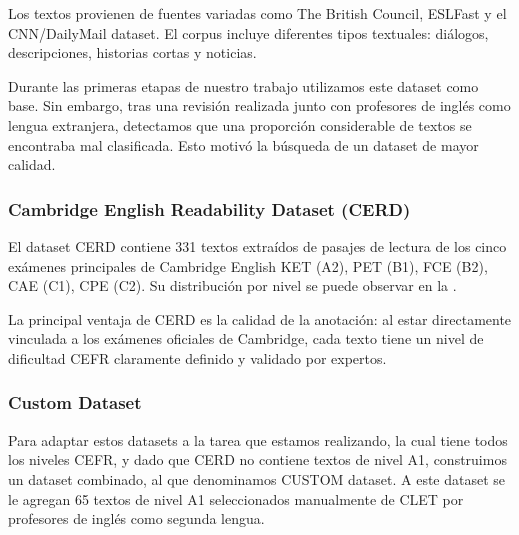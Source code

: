 Los textos provienen de fuentes variadas como The British Council, ESLFast y el CNN/DailyMail dataset. El corpus incluye diferentes tipos textuales: diálogos, descripciones, historias cortas y noticias.

Durante las primeras etapas de nuestro trabajo utilizamos este dataset como base. Sin embargo, tras una revisión realizada junto con profesores de inglés como lengua extranjera, detectamos que una proporción considerable de textos se encontraba mal clasificada. Esto motivó la búsqueda de un dataset de mayor calidad.

\subsubsection*{Cambridge English Readability Dataset (CERD)}
El dataset CERD contiene 331 textos extraídos de pasajes de lectura de los cinco exámenes principales de Cambridge English KET (A2), PET (B1), FCE (B2), CAE (C1), CPE (C2). Su distribución por nivel se puede observar en la .

\begin{table}[H]
\centering
{}
\caption{Distribución de la clasificación de textos para CERD.}
\label{tab:CERD}
\end{table}

La principal ventaja de CERD es la calidad de la anotación: al estar directamente vinculada a los exámenes oficiales de Cambridge, cada texto tiene un nivel de dificultad CEFR claramente definido y validado por expertos.

\subsubsection*{Custom Dataset}
Para adaptar estos datasets a la tarea que estamos realizando, la cual tiene todos los niveles CEFR, y dado que CERD no contiene textos de nivel A1, construimos un dataset combinado, al que denominamos CUSTOM dataset. A este dataset se le agregan 65 textos de nivel A1 seleccionados manualmente de CLET por profesores de inglés como segunda lengua.

